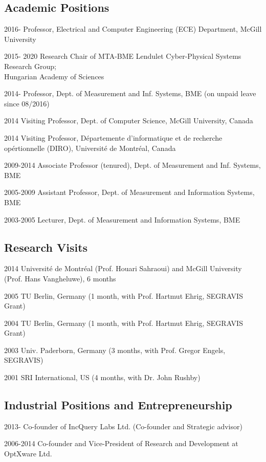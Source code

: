 \subsection{Academic Positions}
\begin{yearlist}
\item[2016-] Professor, Electrical and Computer Engineering (ECE) Department, McGill University
\item[2015- 2020] Research Chair of MTA-BME Lendulet Cyber-Physical Systems Research Group; \\ Hungarian Academy of Sciences 
\item[2014-] Professor, Dept. of Measurement and Inf. Systems, BME  (on unpaid leave since 08/2016)
\item[2014] Visiting Professor, Dept. of Computer Science, McGill University, Canada
\item[2014] Visiting Professor, D\'epartemente d'informatique et de recherche op\'ertionnelle (DIRO), Universit\'e de Montr\'eal, Canada
\item[2009-2014] Associate Professor (tenured), Dept. of Measurement and Inf. Systems, BME 	
\item[2005-2009] Assistant Professor, Dept. of Measurement and Information Systems, BME 
\item[2003-2005] Lecturer, Dept. of Measurement and Information Systems, BME
\end{yearlist}

\subsection{Research Visits} 
\begin{yearlist}
\item[2014] Universit\'e de Montr\'eal (Prof. Houari Sahraoui) and McGill University (Prof. Hans Vangheluwe),  6 months
\item[2005] TU Berlin, Germany (1 month, with Prof. Hartmut Ehrig, SEGRAVIS Grant)
\item[2004] TU Berlin, Germany (1 month, with Prof. Hartmut Ehrig, SEGRAVIS Grant)
\item[2003] Univ. Paderborn, Germany (3 months, with Prof. Gregor Engels, SEGRAVIS) 
\item[2001] SRI International, US (4 months, with Dr. John Rushby) 
\end{yearlist}

\subsection{Industrial Positions and Entrepreneurship} 
\begin{yearlist}
\item[2013-] Co-founder of IncQuery Labs Ltd. (Co-founder and Strategic advisor) 
\item[2006-2014] Co-founder and Vice-President of Research and Development at OptXware Ltd. 
\end{yearlist}

